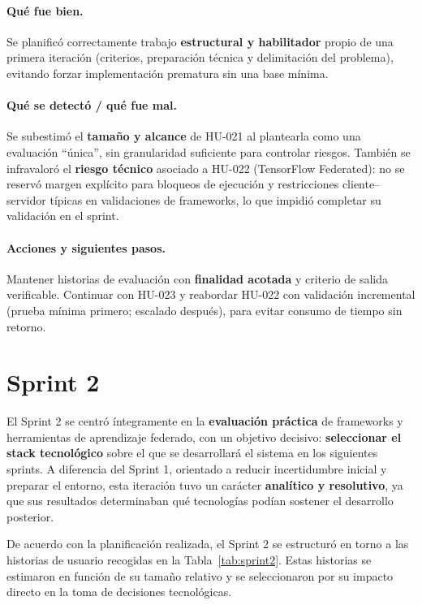 \documentclass{report}
\begin{document}
\vspace{0.15em}
\paragraph{Qué fue bien.}
Se planificó correctamente trabajo \textbf{estructural y habilitador} propio de una primera iteración (criterios, preparación técnica y delimitación del problema), evitando forzar implementación prematura sin una base mínima.

\vspace{0.15em}
\paragraph{Qué se detectó / qué fue mal.}
Se subestimó el \textbf{tamaño y alcance} de HU-021 al plantearla como una evaluación “única”, sin granularidad suficiente para controlar riesgos. También se infravaloró el \textbf{riesgo técnico} asociado a HU-022 (TensorFlow Federated): no se reservó margen explícito para bloqueos de ejecución y restricciones cliente--servidor típicas en validaciones de frameworks, lo que impidió completar su validación en el sprint.

\vspace{0.15em}
\paragraph{Acciones y siguientes pasos.}
Mantener historias de evaluación con \textbf{finalidad acotada} y criterio de salida verificable. Continuar con HU-023 y reabordar HU-022 con validación incremental (prueba mínima primero; escalado después), para evitar consumo de tiempo sin retorno.




\section{Sprint 2}
\label{sect:Sp2}
El Sprint 2 se centró íntegramente en la \textbf{evaluación práctica} de frameworks y herramientas de aprendizaje federado, con un objetivo decisivo: \textbf{seleccionar el stack tecnológico} sobre el que se desarrollará el sistema en los siguientes sprints. A diferencia del Sprint 1, orientado a reducir incertidumbre inicial y preparar el entorno, esta iteración tuvo un carácter \textbf{analítico y resolutivo}, ya que sus resultados determinaban qué tecnologías podían sostener el desarrollo posterior.

De acuerdo con la planificación realizada, el Sprint 2 se estructuró en torno a las historias de usuario recogidas en la Tabla~\ref{tab:sprint2}. Estas historias se estimaron en función de su tamaño relativo y se seleccionaron por su impacto directo en la toma de decisiones tecnológicas.
\end{document}
